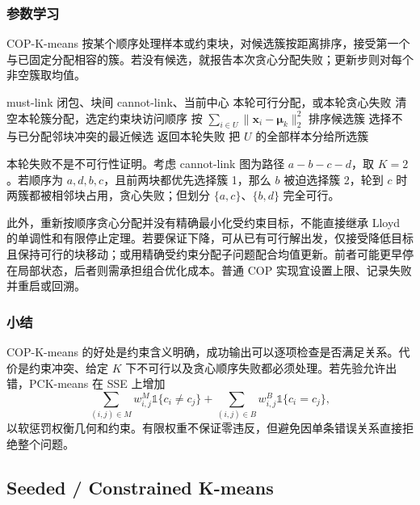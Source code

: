 \subsubsection{参数学习}

COP-K-means 按某个顺序处理样本或约束块，对候选簇按距离排序，接受第一个与已固定分配相容的簇。若没有候选，就报告本次贪心分配失败；更新步则对每个非空簇取均值。

\begin{algorithm}
 \label{alg:clustering-cop}
 \begin{algorithmic}[1]
 \Require must-link 闭包、块间 cannot-link、当前中心
 \Ensure 本轮可行分配，或本轮贪心失败
 \State 清空本轮簇分配，选定约束块访问顺序
  \State 按 $\sum_{i\in U}\lVert\bm{x}_i-\bm{\mu}_k\rVert_2^2$ 排序候选簇
  \State 选择不与已分配邻块冲突的最近候选
   \State 返回本轮失败
  \EndIf
  \State 把 $U$ 的全部样本分给所选簇
 \EndFor
 \end{algorithmic}
\end{algorithm}

本轮失败不是不可行性证明。考虑 cannot-link 图为路径 $a-b-c-d$，取 $K=2$。若顺序为 $a,d,b,c$，且前两块都优先选择簇 1，那么 $b$ 被迫选择簇 2，轮到 $c$ 时两簇都被相邻块占用，贪心失败；但划分 $\{a,c\}$、$\{b,d\}$ 完全可行。

此外，重新按顺序贪心分配并没有精确最小化受约束目标，不能直接继承 Lloyd 的单调性和有限停止定理。若要保证下降，可从已有可行解出发，仅接受降低目标且保持可行的块移动；或用精确受约束分配子问题配合均值更新。前者可能更早停在局部状态，后者则需承担组合优化成本。普通 COP 实现宜设置上限、记录失败并重启或回溯。

\subsubsection{小结}

COP-K-means 的好处是约束含义明确，成功输出可以逐项检查是否满足关系。代价是约束冲突、给定 $K$ 下不可行以及贪心顺序失败都必须处理。若先验允许出错，PCK-means 在 SSE 上增加
\[
 \sum_{(i,j)\in M}w_{i,j}^{M}\mathbb{1}\{c_i\ne c_j\}
 +\sum_{(i,j)\in B}w_{i,j}^{B}\mathbb{1}\{c_i=c_j\},
\]
以软惩罚权衡几何和约束。有限权重不保证零违反，但避免因单条错误关系直接拒绝整个问题。

\subsection{Seeded / Constrained K-means}
\label{sec:clustering-seeded}


